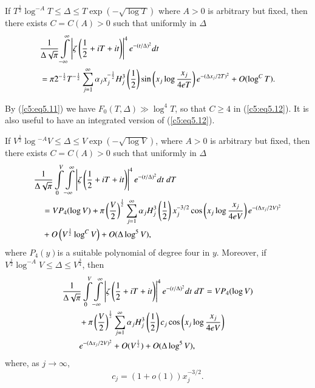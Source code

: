  \begin{thm}\label{c5:thm5.2}
 If $T^{\frac{1}{2}} \log^{-A} T \leq \Delta \leq T \exp (-\sqrt{\log T})$ where $A>0$ is arbitrary but fixed, then there exists $C = C(A) >0$ such that uniformly in $\Delta$
 \begin{align}
& \frac{1}{\Delta \sqrt{\pi}} \int\limits^\infty_{-\infty} \left|\zeta \left(\frac{1}{2} + i T + it \right)\right|^4 e^{-(t/\Delta)^2} dt\label{c5:eq5.12}\\
& = \pi 2^{-\frac{1}{2}} T^{-\frac{1}{2}}  \sum\limits^\infty_{j=1}
   \alpha_j x^{-\frac{1}{2}}_j H^3_j \left(\frac{1}{2} \right) \sin
   \left(x_j \log \frac{x_j}{4eT} \right) e^{-(\Delta x_j/ 2T)^2} + O
   (\log^CT).\notag 
 \end{align}
 \end{thm}

 By (\ref{c5:eq5.11}) we have $F_0(T,\Delta) \gg \log^4T$, so that $C \geq 4$ in (\ref{c5:eq5.12}). It is also useful to have an integrated version of (\ref{c5:eq5.12}).

 \begin{thm}\label{c5:thm5.3}
 If $V^{\frac{1}{2}} \log {}^{-A} V \leq \Delta \leq V \exp (-\sqrt{\log V})$, where $A>0$ is arbitrary but fixed, then there exists $C = C(A) > 0$ such that uniformly in $\Delta$
{\fontsize{10pt}{12pt}\selectfont
 \begin{align}
&  \frac{1}{\Delta \sqrt{\pi}} \int\limits^V_0
   \int\limits^\infty_{-\infty} \left|\zeta \left(\frac{1}{2} + iT +
   it \right) \right|^4 e^{-(t/\Delta)^2} dt \; dT
    \label{c5:eq5.13}\\  
& \quad = VP_4 (\log V)  + \pi \left(\frac{V}{2} \right)^{\frac{1}{2}} 
 \sum\limits^\infty_{j=1} \alpha_j H^3_j \left(\frac{1}{2} \right)
 x^{-3/2}_j \cos \left(x_j \log \frac{x_j}{4eV} \right) e^{-(\Delta x_j
   / 2V)^2}\notag\\
&\quad + O\left(V^{\frac{1}{2}} \log^C V\right) + O(\Delta \log^5 V),\notag 
 \end{align}}
 where $P_4(y)$\pageoriginale is a suitable polynomial of degree four
 in $y$. Moreover, if $V^{\frac{1}{2}} \log^{-A} V \leq \Delta \leq
 V^{\frac{3}{4}}$, then  
 \begin{align}
&  \frac{1}{\Delta \sqrt{\pi}} \int\limits^V_0
   \int\limits^\infty_{-\infty} \left|\zeta \left(\frac{1}{2} + iT +
   it \right)\right|^4 e^{-(t/\Delta)^2} dt \; dT = VP_4 (\log V)\notag \\ 
& \qquad  +\pi \left(\frac{V}{2} \right)^{\frac{1}{2}}
   \sum\limits^\infty_{j=1} \alpha_j H^3_j \left(\frac{1}{2} \right)
   c_j \cos \left(x_j \log \frac{x_j}{4eV} \right)\notag\\ 
& \qquad e^{-(\Delta x_j / 2 V)^2} + O (V^{\frac{1}{2}}) + O (\Delta \log^5 V),\label{c5:eq5.14}
 \end{align}
 where, as $j \to \infty$,
 $$
 c_j = (1+ o(1)) x^{-3/2}_j. 
 $$
 \end{thm}


